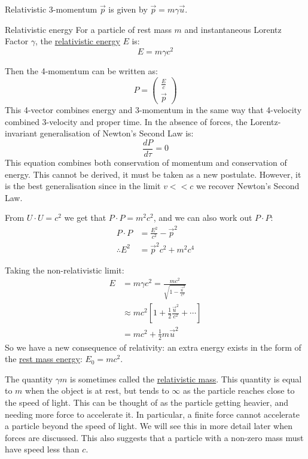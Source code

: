 \documentclass[../Main.tex]{subfiles}
\begin{document}
Relativistic 3-momentum $\vec{p}$ is given by $\vec{p} = m\gamma \vec{u}$.
\begin{definition}{Relativistic energy}
    For a particle of rest mass $m$ and instantaneous Lorentz Factor $\gamma$, the \underline{relativistic energy} $E$ is:
    \begin{equation*}
        E = m\gamma c^2
    \end{equation*}
\end{definition}
Then the 4-momentum can be written as:
\begin{equation*}
    P = \begin{pmatrix}\frac{E}{c} \\ \vec{p} \end{pmatrix}
\end{equation*}
This 4-vector combines energy and 3-momentum in the same way that 4-velocity combined 3-velocity and proper time. In the absence of forces, the Lorentz-invariant generalisation of Newton's Second Law is:
\begin{equation}
    \frac{dP}{d\tau} = 0
    \label{eqnNewtonIIRelativity}
\end{equation}
This equation combines both conservation of momentum and conservation of energy. This cannot be derived, it must be taken as a new postulate. However, it is the best generalisation since in the limit $v << c$ we recover Newton's Second Law.

From $U \cdot U = c^2$ we get that $P \cdot P = m^2 c^2$, and we can also work out $P \cdot P$:
\begin{align*}
    P \cdot P &= \frac{E^2}{c^2} - \vec{p}^2 \\
    \therefore E^2 &= \vec{p}^2 c^2 + m^2 c^4
\end{align*}

Taking the non-relativistic limit:
\begin{align*}
    E &= m\gamma c^2 = \frac{mc^2}{\sqrt{1 - \frac{\vec{u}^2}{c^2}}} \\
    &\approx mc^2 \left[1 + \frac{1}{2} \frac{\vec{u}^2}{c^2} + \cdots \right] \\
    &= mc^2 + \frac{1}{2} m\vec{u}^2
\end{align*}
So we have a new consequence of relativity: an extra energy exists in the form of the \underline{rest mass energy}: $E_0 = mc^2$.

The quantity $\gamma m$ is sometimes called the \underline{relativistic mass}. This quantity is equal to $m$ when the object is at rest, but tends to $\infty$ as the particle reaches close to the speed of light. This can be thought of as the particle getting heavier, and needing more force to accelerate it. In particular, a finite force cannot accelerate a particle beyond the speed of light. We will see this in more detail later when forces are discussed. This also suggests that a particle with a non-zero mass must have speed less than $c$.
\end{document}
